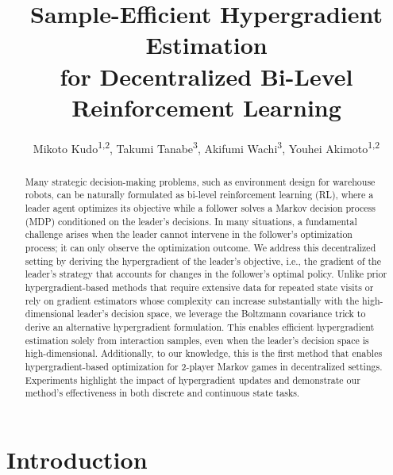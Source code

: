 \documentclass[letterpaper]{article} %
\title{Sample-Efficient Hypergradient Estimation\\for Decentralized Bi-Level Reinforcement Learning}
\author {
    Mikoto Kudo\textsuperscript{\rm 1,2},
    Takumi Tanabe\textsuperscript{\rm 3},
    Akifumi Wachi\textsuperscript{\rm 3},
    Youhei Akimoto\textsuperscript{\rm 1,2}
}
\begin{document}
\maketitle

\begin{abstract}
Many strategic decision-making problems, such as environment design for warehouse robots, can be naturally formulated as bi-level reinforcement learning (RL), where a leader agent optimizes its objective while a follower solves a Markov decision process (MDP) conditioned on the leader's decisions.
In many situations, a fundamental challenge arises when the leader cannot intervene in the follower's optimization process; it can only observe the optimization outcome. 
We address this decentralized setting by deriving the hypergradient of the leader's objective, i.e., the gradient of the leader's strategy that accounts for changes in the follower's optimal policy.
Unlike prior hypergradient-based methods that require extensive data for repeated state visits or rely on gradient estimators whose complexity can increase substantially with the high-dimensional leader's decision space, we leverage the Boltzmann covariance trick to derive an alternative hypergradient formulation. 
This enables efficient hypergradient estimation solely from interaction samples, even when the leader's decision space is high-dimensional.
Additionally, to our knowledge, this is the first method that enables hypergradient-based optimization for 2-player Markov games in decentralized settings. 
Experiments highlight the impact of hypergradient updates and demonstrate our method's effectiveness in both discrete and continuous state tasks.
\end{abstract}

\begin{links}
\end{links}



\section{Introduction}
\end{document}
